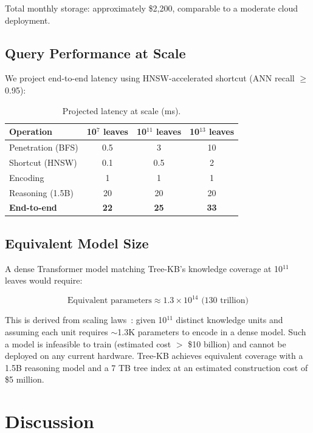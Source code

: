 \documentclass[11pt,a4paper]{article}
\begin{document}
Total monthly storage: approximately \$2,200, comparable to a moderate cloud deployment.

\subsection{Query Performance at Scale}

We project end-to-end latency using HNSW-accelerated shortcut (ANN recall $\geq$ 0.95):

\begin{table}[H]
\centering
\caption{Projected latency at scale (ms).}
\label{tab:latency}
\begin{tabular}{lccc}
\toprule
\textbf{Operation} & \textbf{10$^7$ leaves} & \textbf{10$^{11}$ leaves} & \textbf{10$^{13}$ leaves} \\
\midrule
Penetration (BFS) & 0.5 & 3 & 10 \\
Shortcut (HNSW) & 0.1 & 0.5 & 2 \\
Encoding & 1 & 1 & 1 \\
Reasoning (1.5B) & 20 & 20 & 20 \\
\rowcolor{gray!10}
\textbf{End-to-end} & \textbf{22} & \textbf{25} & \textbf{33} \\
\bottomrule
\end{tabular}
\end{table}

\subsection{Equivalent Model Size}

A dense Transformer model matching Tree-KB's knowledge coverage at 10$^{11}$ leaves would require:

\begin{equation}
\text{Equivalent parameters} \approx 1.3 \times 10^{14} \text{ (130 trillion)}
\end{equation}

This is derived from scaling laws~\cite{kaplan2020scaling}: given 10$^{11}$ distinct knowledge units and assuming each unit requires $\sim$1.3K parameters to encode in a dense model. Such a model is infeasible to train (estimated cost $>$ \$10 billion) and cannot be deployed on any current hardware. Tree-KB achieves equivalent coverage with a 1.5B reasoning model and a 7 TB tree index at an estimated construction cost of \$5 million.

\section{Discussion}
\label{sec:discussion}
\end{document}
